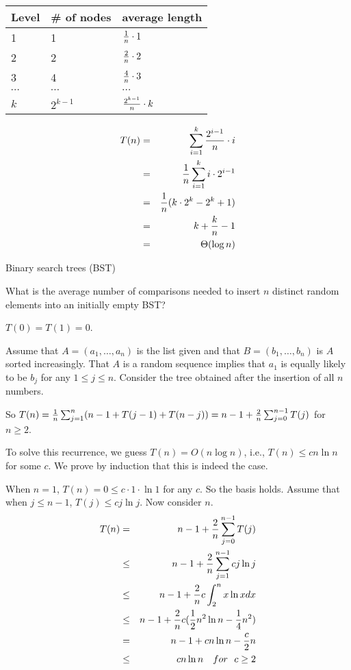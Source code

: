 \begin{center}
\begin{tabular}{l|l|l}
Level & \# of nodes & average length\\ \hline
1 & 1 & ${1\over n}\cdot 1$\\
2 & 2 & ${2\over n}\cdot 2$\\
3 & 4 & ${4\over n}\cdot 3$\\
$\cdots$ & $\cdots$ & $\cdots$\\
$k$ & $2^{k-1}$ & ${2^{k-1}\over n}\cdot k$
\end{tabular}
\end{center}

\begin{eqnarray*}
T(n)&=&\sum_{i=1}^k {2^{i-1}\over n}\cdot i\\
&=&{1\over n}\sum_{i=1}^k i\cdot 2^{i-1}\\
&=&{1\over n}(k\cdot 2^k-2^k+1)\\
&=&k+{k\over n}-1\\
&=&\Theta(\log n)
\end{eqnarray*}


Binary search trees (BST)

What is the average number of comparisons needed to insert $n$
distinct random elements into an initially empty BST?

$T(0)=T(1)=0$.

Assume that $A=(a_1,\ldots,a_n)$ is the list given and that 
$B=(b_1,\ldots,b_n)$ is $A$ sorted increasingly.
That $A$ is a random sequence implies that $a_1$ is equally likely
to be $b_j$ for any $1\le j\le n$. Consider the tree obtained after
the insertion of all $n$ numbers.

So $T(n)={1\over n}\sum_{j=1}^n(n-1+T(j-1)+T(n-j))=n-1+{2\over n}
\sum_{j=0}^{n-1}T(j)$ for $n\ge2$.

To solve this recurrence, we guess $T(n)=O(n\log n)$, i.e., 
$T(n)\le cn\ln n$ for some $c$. We prove by induction that
this is indeed the case.

When $n=1$, $T(n)=0\le c\cdot 1\cdot \ln 1$ for any $c$. So the
basis holds. Assume that when $j\le n-1$, $T(j)\le cj\ln j$.
Now consider $n$.
\begin{eqnarray*}
T(n)&=&n-1+{2\over n}\sum_{j=0}^{n-1}T(j)\\
&\le&n-1+{2\over n}\sum_{j=1}^{n-1}cj\ln j\\
&\le&n-1+{2\over n}c\int_2^n x\ln xdx\\
&\le&n-1+{2\over n}c({1\over2}n^2\ln n-{1\over4}n^2)\\
&=&n-1+cn\ln n-{c\over2}n\\
&\le&cn\ln n { \quad for\ \ } c\ge  2
\end{eqnarray*}


